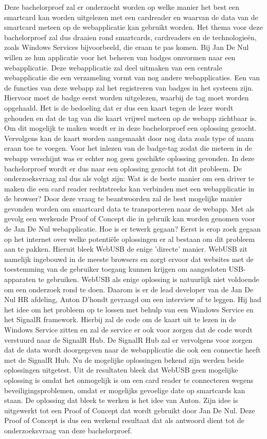 Deze bachelorproef zal er onderzocht worden op welke manier het best een smartcard kan worden uitgelezen met een cardreader en waarvan de data van de smartcard meteen op de webapplicatie kan gebruikt worden. Het thema voor deze bachelorproef zal dus draaien rond smartcards, cardreaders en de technologieën, zoals Windows Services bijvoorbeeld, die eraan te pas komen. Bij Jan De Nul willen ze hun applicatie voor het beheren van badges omvormen naar een webapplicatie. Deze webapplicatie zal deel uitmaken van een centrale webapplicatie die een verzameling vormt van nog andere webapplicaties. Een van de functies van deze webapp zal het registreren van badges in het systeem zijn. Hiervoor moet de badge eerst worden uitgelezen, waarbij de tag moet worden opgehaald. Het is de bedoeling dat er dus een kaart tegen de lezer wordt gehouden en dat de tag van die kaart vrijwel meteen op de webapp zichtbaar is. Om dit mogelijk te maken wordt er in deze bachelorproef een oplossing gezocht. Vervolgens kan de kaart worden aangemaakt door nog data zoals type of naam eraan toe te voegen. 
Voor het inlezen van de badge-tag zodat die meteen in de webapp verschijnt was er echter nog geen geschikte oplossing gevonden. In deze bachelorproef wordt er dus naar een oplossing gezocht tot dit probleem. De onderzoeksvraag zal dus als volgt zijn: Wat is de beste manier om een driver te maken die een card reader rechtstreeks kan verbinden met een webapplicatie in de browser? Door deze vraag te beantwoorden zal de best mogelijke manier gevonden worden om smartcard data te transporteren naar de webapp. Met als gevolg een werkende Proof of Concept die in gebruik kan worden genomen voor de Jan De Nul webapplicatie. 
Hoe is er tewerk gegaan? Eerst is erop zoek gegaan op het internet over welke potentiële oplossingen er al bestaan om dit probleem aan te pakken. Hieruit bleek WebUSB de enige 'directe' manier. WebUSB zit namelijk ingebouwd in de meeste browsers en zorgt ervoor dat websites met de toestemming van de gebruiker toegang kunnen krijgen om aangesloten USB-apparaten te gebruiken. WebUSB als enige oplossing is natuurlijk niet voldoende om een onderzoek rond te doen. Daarom is er de lead developer van de Jan De Nul HR afdeling, Anton D'hondt gevraagd om een interview af te leggen. Hij had het idee om het probleem op te lossen met behulp van een Windows Service en het SignalR framework. Hierbij zal de code om de kaart uit te lezen in de Windows Service zitten en zal de service er ook voor zorgen dat de code wordt verstuurd naar de SignalR Hub. De SignalR Hub zal er vervolgens voor zorgen dat de data wordt doorgegeven naar de webapplicatie die ook een connectie heeft met de SignalR Hub. Nu de mogelijke oplossingen bekend zijn werden beide oplossingen uitgetest. 
Uit de resultaten bleek dat WebUSB geen mogelijke oplossing is omdat het onmogelijk is om een card reader te connecteren wegens beveiligingsproblemen, omdat er mogelijks gevoelige date op smartcards kan staan. De oplossing dat bleek te werken is het idee van Anton. Zijn idee is uitgewerkt tot een Proof of Concept dat wordt gebruikt door Jan De Nul. Deze Proof of Concept is dus een werkend resultaat dat als antwoord dient tot de onderzoeksvraag van deze bachelorproef.
